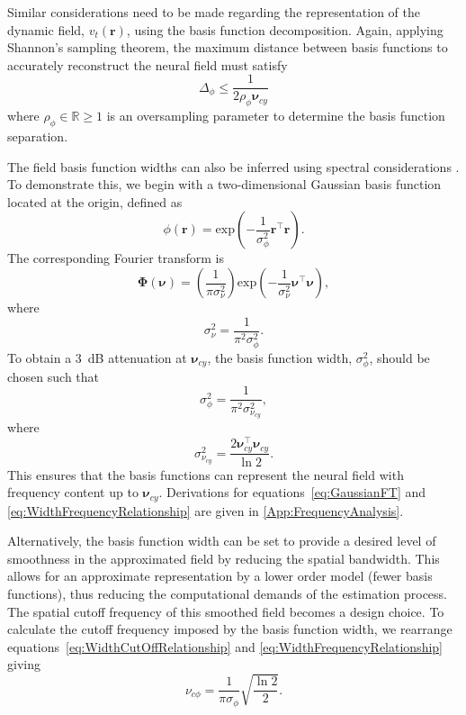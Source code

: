 \documentclass[review,authoryear,3p]{elsarticle}
\begin{document}
Similar considerations need to be made regarding the representation of the dynamic field, $v_t(\mathbf{r})$, using the basis function decomposition. Again, applying Shannon's sampling theorem, the maximum distance between basis functions to accurately reconstruct the neural field must satisfy 
\begin{equation}\label{eq:BasisFunctionSeparation}
	\Delta_{\phi} \leq \frac{1}{2\rho_{\phi}\boldsymbol{\nu}_{cy}}
\end{equation}
where $\rho_{\phi} \in \mathbb{R} \ge 1$ is an oversampling parameter to determine the basis function separation. 

The field basis function widths can also be inferred using spectral considerations \citep{Sanner1992,Scerri2009}. To demonstrate this, we begin with a two-dimensional Gaussian basis function located at the origin, defined as
\begin{equation}\label{eq:BasisFunctionAtOrigin}
 \phi(\mathbf r)=\mathrm{exp}\left({-\frac{1}{\sigma_{\phi}^2} \mathbf r^\top\mathbf r}\right).
\end{equation}
The corresponding Fourier transform is
\begin{equation}\label{eq:GaussianFT}
\boldsymbol\Phi(\boldsymbol \nu)=\left(\frac{1}{\pi\sigma_{\nu}^2}\right)\mathrm{exp}\left(-\frac{1}{\sigma_{\nu}^2}\boldsymbol\nu^\top \boldsymbol\nu\right),
\end{equation}
where 
\begin{equation}\label{eq:GaussianFTWidth}
	\sigma^2_{\nu} = \frac{1}{\pi^2\sigma_{\phi}^2}. 
\end{equation}
To obtain a 3~dB attenuation at $\boldsymbol\nu_{cy}$, the basis function width, $\sigma^2_{\phi}$, should be chosen such that
\begin{equation}\label{eq:WidthCutOffRelationship}
 \sigma^2_{\phi}= \frac{1}{\pi^2\sigma_{\nu_{cy}}^2},
\end{equation}
where
\begin{equation}\label{eq:WidthFrequencyRelationship}
 \sigma^2_{\nu_{cy}}= \frac{2\boldsymbol\nu_{cy}^\top \boldsymbol\nu_{cy}}{\ln2}.
\end{equation}
This ensures that the basis functions can represent the neural field with frequency content up to $\boldsymbol\nu_{cy}$. Derivations for equations~\ref{eq:GaussianFT} and \ref{eq:WidthFrequencyRelationship} are given in \ref{App:FrequencyAnalysis}.

Alternatively, the basis function width can be set to provide a desired level of smoothness in the approximated field by reducing the spatial bandwidth. This allows for an approximate representation by a lower order model (fewer basis functions), thus reducing the computational demands of the estimation process. The spatial cutoff frequency of this smoothed field becomes a design choice. To calculate the cutoff frequency imposed by the basis function width, we rearrange equations~\ref{eq:WidthCutOffRelationship} and \ref{eq:WidthFrequencyRelationship} giving
\begin{equation}\label{eq:CutoffFromBasisFuncWidth}
	\nu_{c\phi}=\frac{1}{\pi\sigma_{\phi}}\sqrt{\frac{\ln2}{2}}.
\end{equation} 
\end{document}
